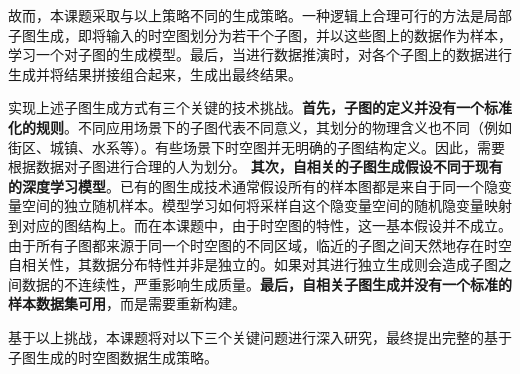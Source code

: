 \documentclass[12pt,UTF8,AutoFakeBold=2,a4paper]{ctexart} %
\begin{document}
故而，本课题采取与以上策略不同的生成策略。一种逻辑上合理可行的方法是局部子图生成，即将输入的时空图划分为若干个子图，并以这些图上的数据作为样本，学习一个对子图的生成模型。最后，当进行数据推演时，对各个子图上的数据进行生成并将结果拼接组合起来，生成出最终结果。

实现上述子图生成方式有三个关键的技术挑战。\textbf{首先，子图的定义并没有一个标准化的规则}。不同应用场景下的子图代表不同意义，其划分的物理含义也不同（例如街区、城镇、水系等）。有些场景下时空图并无明确的子图结构定义。因此，需要根据数据对子图进行合理的人为划分。%
\textbf{其次，自相关的子图生成假设不同于现有的深度学习模型}。已有的图生成技术通常假设所有的样本图都是来自于同一个隐变量空间的独立随机样本。模型学习如何将采样自这个隐变量空间的随机隐变量映射到对应的图结构上。而在本课题中，由于时空图的特性，这一基本假设并不成立。由于所有子图都来源于同一个时空图的不同区域，临近的子图之间天然地存在时空自相关性，其数据分布特性并非是独立的。如果对其进行独立生成则会造成子图之间数据的不连续性，严重影响生成质量。\textbf{最后，自相关子图生成并没有一个标准的样本数据集可用}，而是需要重新构建。

基于以上挑战，本课题将对以下三个关键问题进行深入研究，最终提出完整的基于子图生成的时空图数据生成策略。
\end{document}
